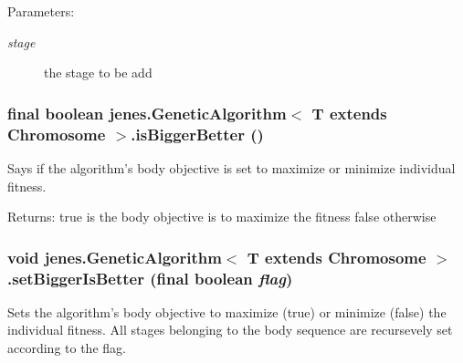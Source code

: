\begin{Desc}
\item[Parameters:]
\begin{description}
\item[{\em stage}]the stage to be add \end{description}
\end{Desc}
\hypertarget{classjenes_1_1_genetic_algorithm_3_01_t_01extends_01_chromosome_01_4_34e6ea627850ec240d4c0bba39170d4b}{
\subsubsection[isBiggerBetter]{\setlength{\rightskip}{0pt plus 5cm}final boolean jenes.GeneticAlgorithm$<$ T extends Chromosome $>$.isBiggerBetter ()}}
\label{classjenes_1_1_genetic_algorithm_3_01_t_01extends_01_chromosome_01_4_34e6ea627850ec240d4c0bba39170d4b}


Says if the algorithm's body objective is set to maximize or minimize individual fitness. 

\begin{Desc}
\item[Returns:]true is the body objective is to maximize the fitness false otherwise \end{Desc}
\hypertarget{classjenes_1_1_genetic_algorithm_3_01_t_01extends_01_chromosome_01_4_fcc4f944d2d47d757e177a22a660bfd3}{
\subsubsection[setBiggerIsBetter]{\setlength{\rightskip}{0pt plus 5cm}void jenes.GeneticAlgorithm$<$ T extends Chromosome $>$.setBiggerIsBetter (final boolean {\em flag})}}
\label{classjenes_1_1_genetic_algorithm_3_01_t_01extends_01_chromosome_01_4_fcc4f944d2d47d757e177a22a660bfd3}


Sets the algorithm's body objective to maximize (true) or minimize (false) the individual fitness. All stages belonging to the body sequence are recursevely set according to the flag. 

